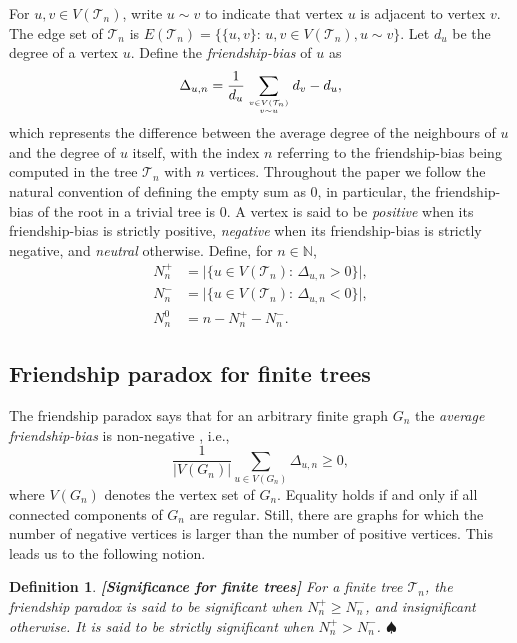 \documentclass[11pt]{article}
\numberwithin{equation}{section}
\theoremstyle{plain}
\newtheorem{definition}[theorem]{Definition}
\newcommand{\N}{\mathbb N}
\begin{document}
For $u, v \in V(\mathcal{T}_n)$, write $u\sim v$ to indicate that vertex $u$ is adjacent to vertex $v$. The edge set of $\mathcal{T}_n$ is $E(\mathcal{T}_n) = \{\{u,v\}\colon\, u,v\in V(\mathcal{T}_n), u \sim v\}$. Let $d_u$ be the degree of a vertex $u$. Define the \textit{friendship-bias} of $u$ as
\[
\Delta_{u,n} = \frac{1}{d_u} \sum_{ {v \in V(\mathcal{T}_n)} \atop {v \sim u} } d_v - d_u,
\]
which represents the difference between the average degree of the neighbours of $u$ and the degree of $u$ itself, with the index $n$ referring to the friendship-bias being computed in the tree $\mathcal{T}_n$ with $n$ vertices. Throughout the paper we follow the natural convention of defining the empty sum as $0$, in particular, the friendship-bias of the root in a trivial tree is $0$. A vertex is said to be \textit{positive} when its friendship-bias is strictly positive, \textit{negative} when its friendship-bias is strictly negative, and \textit{neutral} otherwise. Define, for $n \in \N$,
\[
\begin{aligned}
N_n^+ &= \big|\big\{u \in V(\mathcal{T}_n)\colon\,\Delta_{u,n} > 0\big\}\big|,\\
N_n^- &= \big|\big\{u \in V(\mathcal{T}_n)\colon\,\Delta_{u,n} < 0\big\}\big|,\\
N_ n^0 &= n - N_n^+ - N_n^-.
\end{aligned}
\]


\subsection{Friendship paradox for finite trees}
\label{sec:FP-finite-tree}

The friendship paradox says that for an arbitrary finite graph $G_n$ the \emph{average friendship-bias} is non-negative \cite{SF,HHP1}, i.e.,
\[
\frac{1}{|V(G_n)|} \sum_{u \in V(G_n)} \Delta_{u,n} \geq 0,
\] 
where $V(G_n)$ denotes the vertex set of $G_n$. Equality holds if and only if all connected components of $G_n$  are regular. Still, there are graphs for which the number of negative vertices is larger than the number of positive vertices. This leads us to the following notion. 

\begin{definition}{\bf [Significance for finite trees]}
{\rm For a finite tree $\mathcal{T}_n$, the friendship paradox is said to be \textit{significant} when $N_n^+ \geq N_n^-$, and \textit{insignificant} otherwise. It is said to be \textit{strictly significant} when $N_n^+ > N_n^-$.} \hfill$\spadesuit$
\label{def:finite-significance}
\end{definition}
\end{document}
